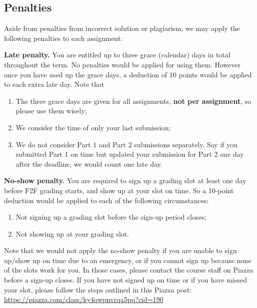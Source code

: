 \documentclass[12pt]{exam}
\begin{document}
\subsection{Penalties}
Aside from penalties from incorrect solution or plagiarism, we may apply the following
penalties to each assignment:

\textbf{Late penalty.} You are entitled up to three grace (calendar) days in total
throughout the term. No penalties would be applied for using them. However once
you have used up the grace days, a deduction of 10 points would be applied to each
extra late day. Note that
\begin{enumerate}
  \item The three grace days are given for all assignments, \textbf{not per assignment}, so please use them wisely;
  \item We consider the time of only your last submission;
  \item We do not consider Part 1 and Part 2 submissions separately. Say if you submitted Part 1 on time but updated your submission for Part 2 one day after the deadline, we would count one late day.
\end{enumerate}

\textbf{No-show penalty.} You are required to sign up a grading slot at least one day
before F2F grading starts, and show up at your slot on time. So a 10-point deduction would
be applied to each of the following circumstances:
\begin{enumerate}
  \item Not signing up a grading slot before the sign-up period closes;
  \item Not showing up at your grading slot.
\end{enumerate}
Note that we would not apply the no-show penalty if you are unable to sign up/show up on
time due to an emergency, or if you cannot sign up because none of the slots work for you.
In those cases, please contact the course staff on Piazza before a sign-up closes. If you have
not signed up on time or if you have missed your slot, please follow the steps outlined in
this Piazza post: {\footnotesize \url{https://piazza.com/class/ky4qwpnvrqa5pq?cid=190}}
\end{document}
